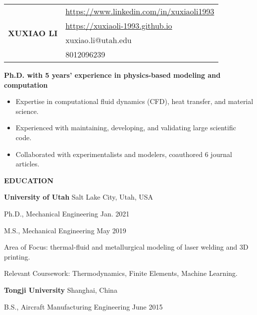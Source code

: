 \documentclass[11pt, letterpaper]{article}
\begin{document}
\begin{tabular}{@{} p{} p{} @{}}
   \multirow{4}{*}{{\textbf{\huge XUXIAO LI}}} & 
    \href{https://www.linkedin.com/in/xuxiaoli1993}{https://www.linkedin.com/in/xuxiaoli1993} \\
     & \href{https://xuxiaoli-1993.github.io}{https://xuxiaoli-1993.github.io} \\
     & xuxiao.li@utah.edu \\
     & 8012096239
\end{tabular}

\vspace{24pt}

\textbf{Ph.D. with 5 years' experience in physics-based modeling and computation}
\begin{itemize}[leftmargin=*, labelsep=5mm]
   \item Expertise in computational fluid dynamics (CFD), heat transfer, and material science.
   \item Experienced with maintaining, developing, and validating large scientific code.
   \item Collaborated with experimentalists and modelers, coauthored 6 journal articles.
\end{itemize}

\vspace{12pt}

\textbf{EDUCATION}

\fullrule

\textbf{University of Utah} \hfill Salt Lake City, Utah, USA

Ph.D., Mechanical Engineering  \hfill Jan. 2021

M.S., Mechanical Engineering  \hfill May 2019

Area of Focus: thermal-fluid and metallurgical modeling of laser welding and 3D printing.

Relevant Coursework: Thermodynamics, Finite Elements, Machine Learning.

\vskip 6pt

\textbf{Tongji University} 
\hfill
Shanghai, China

B.S., Aircraft Manufacturing Engineering \hfill June 2015

\vskip 9pt

% 
% 
\end{document}
